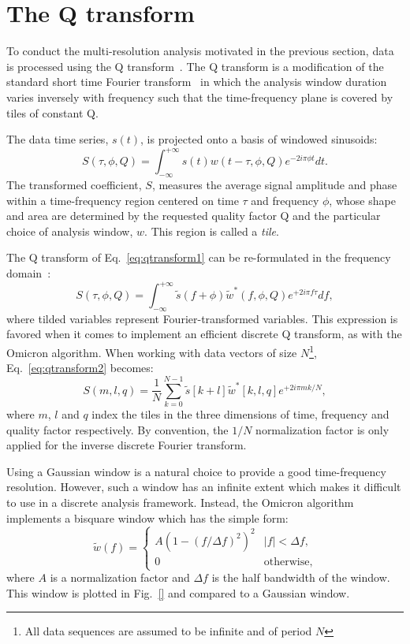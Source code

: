 \section{The Q transform} \label{sec:qtransform}
To conduct the multi-resolution analysis motivated in the previous section, data is processed using the Q transform~\cite{Brown:1991}. The Q transform is a modification of the standard short time Fourier transform~\cite{Gabor:1946} in which the analysis window duration varies inversely with frequency such that the time-frequency plane is covered by tiles of constant Q.

The data time series, $s(t)$, is projected onto a basis of windowed sinusoids:
\begin{equation}
  S(\tau, \phi, Q) = \int_{-\infty}^{+\infty}{ s(t) w(t-\tau,\phi,Q) e^{-2i\pi\phi t}dt}.
  \label{eq:qtransform1}
\end{equation}
The transformed coefficient, $S$, measures the average signal amplitude and phase within a time-frequency region centered on time $\tau$ and frequency $\phi$, whose shape and area are determined by the requested quality factor Q and the particular choice of analysis window, $w$. This region is called a \textit{tile}.

The Q transform of Eq.~\ref{eq:qtransform1} can be re-formulated in the frequency domain~\cite{Chatterji:2004}:
\begin{equation}
  S(\tau, \phi, Q) = \int_{-\infty}^{+\infty}{ \tilde{s}(f+\phi) \tilde{w}^{*}(f,\phi,Q) e^{+2i\pi f \tau}df},
  \label{eq:qtransform2}
\end{equation}
where tilded variables represent Fourier-transformed variables. This expression is favored when it comes to implement an efficient discrete Q transform, as with the Omicron algorithm. When working with data vectors of size $N$\footnote{All data sequences are assumed to be infinite and of period $N$}, Eq.~\ref{eq:qtransform2} becomes:
\begin{equation}
  S(m,l,q) = \frac{1}{N}\sum_{k=0}^{N-1}{\tilde{s}[k+l]\tilde{w}^{*}[k,l,q]e^{+2i\pi mk/N}},
  \label{eq:qtransform3}
\end{equation}
where $m$, $l$ and $q$ index the tiles in the three dimensions of time, frequency and quality factor respectively. By convention, the $1/N$ normalization factor is only applied for the inverse discrete Fourier transform.

Using a Gaussian window is a natural choice to provide a good time-frequency resolution. However, such a window has an infinite extent which makes it difficult to use in a discrete analysis framework. Instead, the Omicron algorithm implements a bisquare window which has the simple form:
\begin{equation}
  \tilde{w}(f) = 
  \begin{cases}
    A\left(1 - (f/\Delta f)^2 \right)^2 & |f| < \Delta f, \\
    0 & \textrm{otherwise},
  \end{cases}
  \label{eq:bisquare}
\end{equation}
where $A$ is a normalization factor and $\Delta f$ is the half bandwidth of the window. This window is plotted in Fig.~\ref{} and compared to a Gaussian window.


